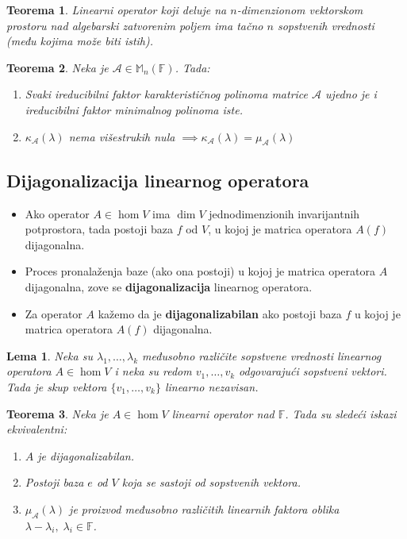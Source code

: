 \documentclass[a4paper,12pt,twoside]{report}
\newtheorem{theorem}{Teorema}[section]
\newtheorem{lemma}{Lema}[section]
\numberwithin{algorithm}{section}
\begin{document}
\begin{theorem}
    Linearni operator koji deluje na $n$-dimenzionom vektorskom prostoru nad algebarski zatvorenim poljem ima tačno $n$ sopstvenih vrednosti (među kojima može
    biti istih).
\end{theorem}

\begin{theorem}
    Neka je $\mathcal{A} \in \mathbb{M}_n(\mathbb{F})$. Tada:
    \begin{enumerate}
        \item Svaki ireducibilni faktor karakterističnog polinoma matrice $\mathcal{A}$ ujedno je i ireducibilni faktor minimalnog polinoma iste.
        \item $\kappa_\mathcal{A}(\lambda)$ nema višestrukih nula $\implies \kappa_\mathcal{A}(\lambda) = \mu_\mathcal{A}(\lambda)$
    \end{enumerate}
\end{theorem}

\subsection{Dijagonalizacija linearnog operatora}

\begin{itemize}
    \item Ako operator $A \in \hom V$ ima $\dim V$ jednodimenzionih invarijantnih potprostora, tada postoji baza $f$ od $V$, u kojoj je matrica operatora $A(f)$ dijagonalna.
    \item Proces pronalaženja baze (ako ona postoji) u kojoj je matrica operatora $A$ dijagonalna, zove se \textbf{dijagonalizacija} linearnog operatora.
    \item Za operator $A$ kažemo da je \textbf{dijagonalizabilan} ako postoji baza $f$ u kojoj je matrica operatora $A(f)$ dijagonalna.
\end{itemize}

\begin{lemma}
    Neka su $\lambda_1, \dots, \lambda_k$ međusobno različite sopstvene vrednosti linearnog operatora $A \in \hom V$ i 
    neka su redom $v_1, \dots, v_k$ odgovarajući sopstveni vektori. Tada je skup vektora $\{v_1, \dots, v_k\}$ linearno nezavisan.
\end{lemma}
\newpage
\begin{theorem}
    Neka je $A \in \hom V$ linearni operator nad $\mathbb{F}$. Tada su sledeći iskazi ekvivalentni:
    \begin{enumerate}
        \item $A$ je dijagonalizabilan.
        \item Postoji baza $e$ od $V$ koja se sastoji od sopstvenih vektora.
        \item $\mu_\mathcal{A}(\lambda)$ je proizvod međusobno različitih linearnih faktora oblika $\lambda - \lambda_i, \; \lambda_i \in \mathbb{F}$.
    \end{enumerate}
\end{theorem}
\end{document}
